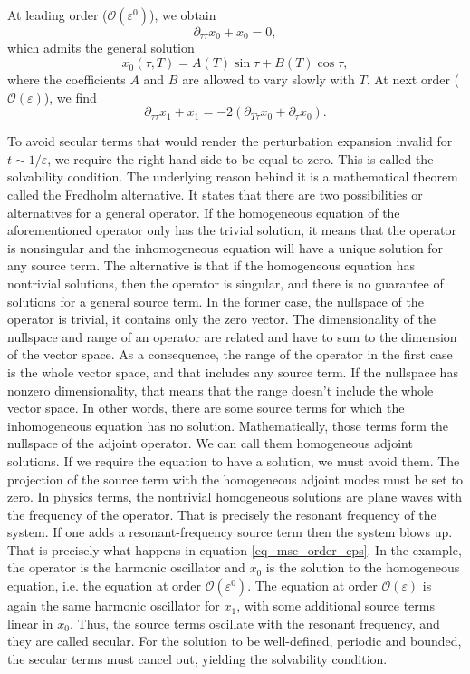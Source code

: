 \documentclass[11pt, a4paper]{article} %
\begin{document}
At leading order ($\mathcal{O}(\varepsilon^0)$), we obtain
\[
\partial_{\tau\tau}x_0 + x_0 = 0,
\]
which admits the general solution
\[
x_0(\tau,T) = A(T)\sin\tau + B(T)\cos\tau,
\]
where the coefficients $A$ and $B$ are allowed to vary slowly with $T$. At next order ($\mathcal{O}(\varepsilon)$), we find
\begin{equation}
    \partial_{\tau\tau}x_1 + x_1 = -2(\partial_{T\tau}x_0 + \partial_\tau x_0).
    \label{eq_mse_order_eps}
\end{equation}

To avoid secular terms that would render the perturbation expansion invalid for $t \sim 1/\varepsilon$, 
we require the right-hand side to be equal to zero. %
This is called the solvability condition. The underlying reason behind it is a mathematical theorem 
called the Fredholm alternative. It states that there are two possibilities or alternatives 
for a general operator. If the homogeneous equation of the aforementioned operator only has the trivial 
solution, it means that the operator is nonsingular and the inhomogeneous equation will have a unique solution for any 
source term. The alternative is that if the homogeneous equation has nontrivial solutions, then 
the operator is singular, and there is no guarantee of solutions for a general source term. In the former case, 
the nullspace of the operator is trivial, it contains only the zero vector. 
The dimensionality of the nullspace and range of an operator are related and have to sum to the 
dimension of the vector space. As a consequence, the range of the operator in the first case 
is the whole vector space, and that includes any source term.
If the nullspace has nonzero dimensionality, that means that the range doesn't include the whole vector space. 
In other words, there are some source terms for which the inhomogeneous equation has no solution. Mathematically, those 
terms form the nullspace of the adjoint operator. We can call them homogeneous adjoint solutions. 
If we require the equation to have a solution, we must avoid them. The projection of the source term with the 
homogeneous adjoint modes must be set to zero. In physics terms, the nontrivial homogeneous solutions are plane waves with the 
frequency of the operator. That is precisely the resonant frequency of the system. If one adds a resonant-frequency source term
then the system blows up. That is precisely what happens in equation \eqref{eq_mse_order_eps}. 
In the example, the operator is the harmonic oscillator and $x_0$ is the solution to the homogeneous equation, i.e. the equation 
at order $\mathcal{O}(\varepsilon^0)$. The equation at order $\mathcal{O}(\varepsilon)$ is again the same harmonic oscillator 
for $x_1$, with some additional source terms linear in $x_0$. Thus, the source terms oscillate with the resonant frequency, and they 
are called secular. For the solution to be well-defined, periodic and bounded, the secular terms must cancel out, yielding 
the solvability condition. 
\end{document}
